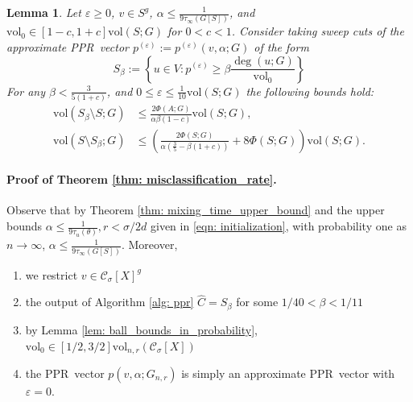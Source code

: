 \documentclass[11pt,twoside]{article}
\newtheorem{lemma}{Lemma}
\newcommand{\vol}{\mathrm{vol}}
\newcommand{\1}{\mathbf{1}}
\newcommand{\pbf}{p}        %
\newcommand{\Xbf}{X}             %
\newcommand{\Cset}{\mathcal{C}}
\newcommand{\Csig}{\Cset_{\sigma}}
\newcommand{\pprspace}{{\sc PPR~}}
\begin{document}
\begin{lemma}
	\label{lem: zhu}
	Let $\varepsilon \geq 0$, $v \in S^g$, $\alpha \leq \frac{1}{9\tau_{\infty}(G[S])}$, and $\vol_0 \in [1 - c,1 + c] \vol(S;G)$ for $0 < c < 1$. Consider taking sweep cuts of the approximate \pprspace vector $\pbf^{(\varepsilon)} := \pbf^{(\varepsilon)}(v,\alpha; G)$ of the form
	\begin{equation*}
	S_{\beta} := \left\{u \in V: \pbf^{(\varepsilon)} \geq \beta \frac{\deg(u; G)}{\vol_0} \right\}
	\end{equation*}
	For any $\beta < \frac{3}{5(1 + c)}$, and $0 \leq \varepsilon \leq \frac{1}{10} \vol(S;G)$ the following bounds hold:
	\begin{align}
	\vol(S_{\beta} \setminus S; G) & \leq \frac{2\Phi(A;G)}{\alpha \beta(1 - c)} \vol(S; G), \label{eqn: zhu_1}\\
	\vol(S \setminus S_{\beta}; G) & \leq \left(\frac{2\Phi(S;G)}{\alpha (\frac{3}{5} - \beta(1 + c))} + 8\Phi(S;G)\right)\vol(S; G).  \label{eqn: zhu_2}
	\end{align}
\end{lemma}

\paragraph{Proof of Theorem \ref{thm: misclassification_rate}.}

Observe that by Theorem \ref{thm: mixing_time_upper_bound} and the upper bounds $\alpha \leq \frac{1}{9 \tau_u(\theta)}, r < \sigma/2d$ given in \eqref{eqn: initialization}, with probability one as $n \to \infty$, $\alpha \leq \frac{1}{9\tau_{\infty}(G[S])}$. Moreover, 
\begin{enumerate}[\text{(i)}]
	\item we restrict $v \in \Csig[\Xbf]^g$
	\item the output of Algorithm \ref{alg: ppr} $\widehat{C} = S_{\beta}$ for some $1/40 < \beta < 1/11$
	\item by Lemma \ref{lem: ball_bounds_in_probability}, $\vol_0 \in [1/2,3/2]\vol_{n,r}(\Csig[\Xbf])$
	\item the \pprspace vector $\pbf(v,\alpha;G_{n,r})$ is simply an approximate \pprspace vector with $\varepsilon = 0$.
\end{enumerate}
\end{document}
